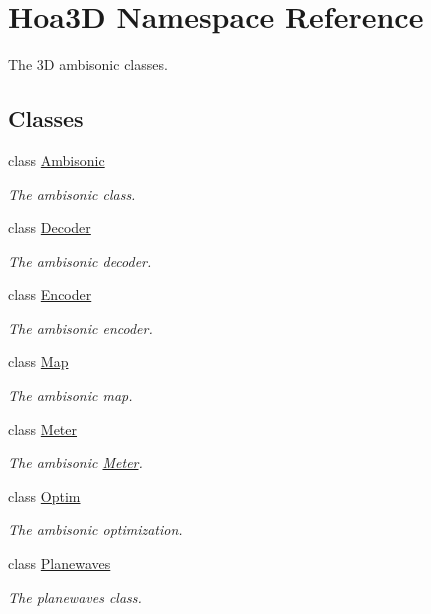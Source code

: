 \hypertarget{namespace_hoa3_d}{\section{Hoa3\-D Namespace Reference}
\label{namespace_hoa3_d}
}


The 3\-D ambisonic classes.  


\subsection*{Classes}
\begin{DoxyCompactItemize}
\item 
class \hyperlink{class_hoa3_d_1_1_ambisonic}{Ambisonic}
\begin{DoxyCompactList}\small\item\em The ambisonic class. \end{DoxyCompactList}\item 
class \hyperlink{class_hoa3_d_1_1_decoder}{Decoder}
\begin{DoxyCompactList}\small\item\em The ambisonic decoder. \end{DoxyCompactList}\item 
class \hyperlink{class_hoa3_d_1_1_encoder}{Encoder}
\begin{DoxyCompactList}\small\item\em The ambisonic encoder. \end{DoxyCompactList}\item 
class \hyperlink{class_hoa3_d_1_1_map}{Map}
\begin{DoxyCompactList}\small\item\em The ambisonic map. \end{DoxyCompactList}\item 
class \hyperlink{class_hoa3_d_1_1_meter}{Meter}
\begin{DoxyCompactList}\small\item\em The ambisonic \hyperlink{class_hoa3_d_1_1_meter}{Meter}. \end{DoxyCompactList}\item 
class \hyperlink{class_hoa3_d_1_1_optim}{Optim}
\begin{DoxyCompactList}\small\item\em The ambisonic optimization. \end{DoxyCompactList}\item 
class \hyperlink{class_hoa3_d_1_1_planewaves}{Planewaves}
\begin{DoxyCompactList}\small\item\em The planewaves class. \end{DoxyCompactList}\item 

\end{DoxyCompactItemize}
